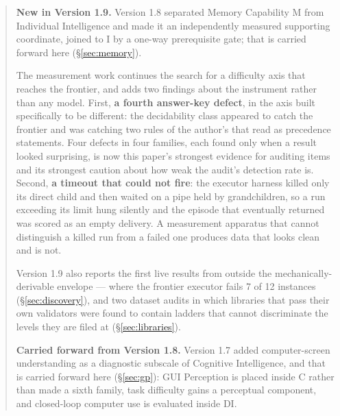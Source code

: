 \documentclass[11pt]{article}
\theoremstyle{definition}
\begin{document}
\begin{abstract}
\medskip
\noindent\textbf{New in Version 1.9.} Version 1.8 separated Memory Capability M from Individual Intelligence and made it an independently measured supporting coordinate, joined to I by a one-way prerequisite gate; that is carried forward here (\S\ref{sec:memory}).

The measurement work continues the search for a difficulty axis that reaches the frontier, and adds two findings about the instrument rather than any model. First, \textbf{a fourth answer-key defect}, in the axis built specifically to be different: the decidability class appeared to catch the frontier and was catching two rules of the author's that read as precedence statements. Four defects in four families, each found only when a result looked surprising, is now this paper's strongest evidence for auditing items and its strongest caution about how weak the audit's detection rate is. Second, \textbf{a timeout that could not fire}: the executor harness killed only its direct child and then waited on a pipe held by grandchildren, so a run exceeding its limit hung silently and the episode that eventually returned was scored as an empty delivery. A measurement apparatus that cannot distinguish a killed run from a failed one produces data that looks clean and is not.

Version 1.9 also reports the first live results from outside the mechanically-derivable envelope --- where the frontier executor fails 7 of 12 instances (\S\ref{sec:discovery}), and two dataset audits in which libraries that pass their own validators were found to contain ladders that cannot discriminate the levels they are filed at (\S\ref{sec:libraries}).

\medskip
\noindent\textbf{Carried forward from Version 1.8.} Version 1.7 added computer-screen understanding as a diagnostic subscale of Cognitive Intelligence, and that is carried forward here (\S\ref{sec:gp}): GUI Perception is placed inside C rather than made a sixth family, task difficulty gains a perceptual component, and closed-loop computer use is evaluated inside DI.


\end{abstract}
\end{document}
